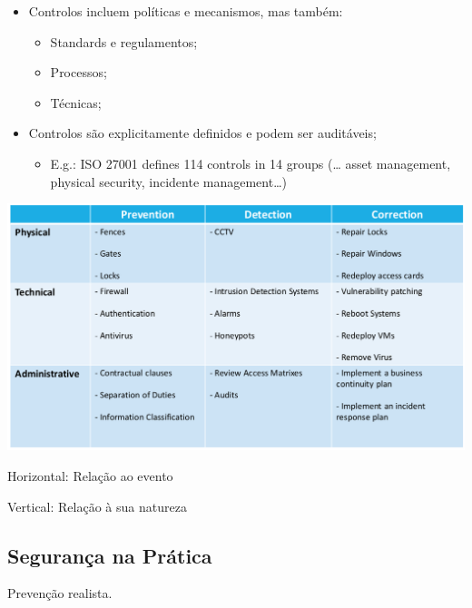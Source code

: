 \documentclass{article}
\begin{document}
\begin{flushleft}
  \begin{itemize}
    \item Controlos incluem políticas e mecanismos, mas também:
    \begin{itemize}
      \item Standards e regulamentos;
      \item Processos;
      \item Técnicas;
    \end{itemize}
    \item Controlos são explicitamente definidos e podem ser auditáveis;
    \begin{itemize}
      \item E.g.: ISO 27001 defines 114 controls in 14 groups (… asset management, physical security, incidente management…)
    \end{itemize}
  \end{itemize}
\end{flushleft}

\begin{center}
  \includegraphics[scale=0.3]{7}

  Horizontal: Relação ao evento

  Vertical: Relação à sua natureza
\end{center}

\pagebreak

\subsection{Segurança na Prática}

Prevenção realista.
\end{document}
